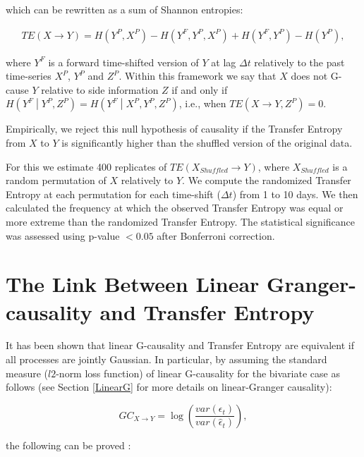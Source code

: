 \documentclass[]{book}
\theoremstyle{definition}
\theoremstyle{definition}
\theoremstyle{definition}
\theoremstyle{remark}
\begin{document}
which can be rewritten as a sum of Shannon entropies:

\begin{align}
TE\left(X \rightarrow Y\right) = H\left(Y^P, X^P\right) - H\left(Y^F, Y^P, X^P\right) + H\left(Y^F, Y^P\right) - H\left(Y^P\right),
\end{align}

where \(Y^F\) is a forward time-shifted version of \(Y\) at lag
\(\Delta t\) relatively to the past time-series \(X^P\), \(Y^P\) and
\(Z^P\). Within this framework we say that \(X\) does not G-cause \(Y\)
relative to side information \(Z\) if and only if
\(H\left(Y^F\middle\vert Y^P,Z^P \right) = H\left(Y^F\middle\vert X^P, Y^P,Z^P\right)\),
i.e., when \(TE\left(X \rightarrow Y,Z^P\right) = 0\).

Empirically, we reject this null hypothesis of causality if the Transfer
Entropy from \(X\) to \(Y\) is significantly higher than the shuffled
version of the original data.

For this we estimate 400 replicates of
\(TE(X_{Shuffled} \rightarrow Y)\), where \(X_{Shuffled}\) is a random
permutation of \(X\) relatively to \(Y\). We compute the randomized
Transfer Entropy at each permutation for each time-shift (\(\Delta t\))
from 1 to 10 days. We then calculated the frequency at which the
observed Transfer Entropy was equal or more extreme than the randomized
Transfer Entropy. The statistical significance was assessed using
p-value \(< 0.05\) after Bonferroni correction.

\section{The Link Between Linear Granger-causality and Transfer
Entropy}\label{the-link-between-linear-granger-causality-and-transfer-entropy}

It has been shown \citep{PhysRevLett.103.238701} that linear G-causality
and Transfer Entropy are equivalent if all processes are jointly
Gaussian. In particular, by assuming the standard measure (\(l2\)-norm
loss function) of linear G-causality for the bivariate case as follows
(see Section \ref{LinearG} for more details on linear-Granger
causality):

\begin{equation}
GC_{X \rightarrow Y} = \log\left( \frac{var(\epsilon_t)}{var( \widehat{\epsilon}_t)} \right),
\label{eq:GCGC}
\end{equation}

the following can be proved \citep{PhysRevLett.103.238701}:
\end{document}
